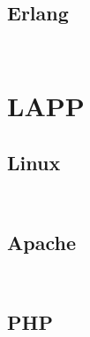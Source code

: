\begin{lstlisting}[language=bash]

\end{lstlisting}


\section{Erlang}


\begin{lstlisting}[language=bash]

\end{lstlisting}




\begin{lstlisting}[language=bash]

\end{lstlisting}


\chapter{LAPP}



\section{Linux}


\begin{lstlisting}[language=bash]

\end{lstlisting}




\begin{lstlisting}[language=bash]

\end{lstlisting}


\section{Apache}


\begin{lstlisting}[language=bash]

\end{lstlisting}





\begin{lstlisting}[language=bash]

\end{lstlisting}

\section{PHP}


